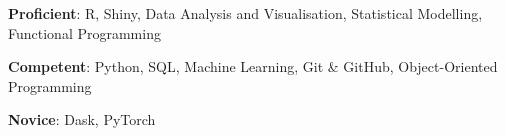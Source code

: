 \textbf{Proficient}: R, Shiny, Data Analysis and Visualisation, Statistical Modelling, Functional Programming

\textbf{Competent}: Python, SQL, Machine Learning, Git \& GitHub, Object-Oriented Programming

\textbf{Novice}: Dask, PyTorch